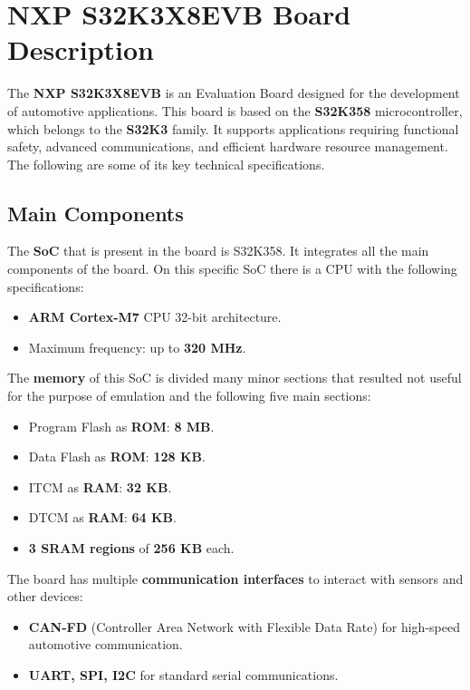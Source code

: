 \section{NXP S32K3X8EVB Board Description}

The \textbf{NXP S32K3X8EVB} \cite{nxp_s32k3x8evb} is an Evaluation Board designed for the development of automotive applications. This board is based on the \textbf{S32K358} microcontroller, which belongs to the \textbf{S32K3} family. It supports applications requiring functional safety, advanced communications, and efficient hardware resource management. The following are some of its key technical specifications.

\subsection{Main Components}
\label{sec:components}

The \textbf{SoC} that is present in the board is S32K358. It integrates all the main components of the board. On this specific SoC there is a CPU with the following specifications:
\begin{itemize}
    \item \textbf{ARM Cortex-M7} CPU 32-bit architecture.
    \item Maximum frequency: up to \textbf{320 MHz}.
\end{itemize}
The \textbf{memory} of this SoC is divided many minor sections that resulted not useful for the purpose of emulation and the following five main sections:
\begin{itemize}
    \item Program Flash as \textbf{ROM}: \textbf{8 MB}.
    \item Data Flash as \textbf{ROM}: \textbf{128 KB}.
    \item ITCM as \textbf{RAM}: \textbf{32 KB}.
    \item DTCM as \textbf{RAM}: \textbf{64 KB}.
    \item \textbf{3 SRAM regions} of \textbf{256 KB} each.
\end{itemize}
The board has multiple \textbf{communication interfaces} to interact with sensors and other devices:
\begin{itemize}
    \item \textbf{CAN-FD} (Controller Area Network with Flexible Data Rate) for high-speed automotive communication.
    \item \textbf{UART, SPI, I2C} for standard serial communications.
\end{itemize}

